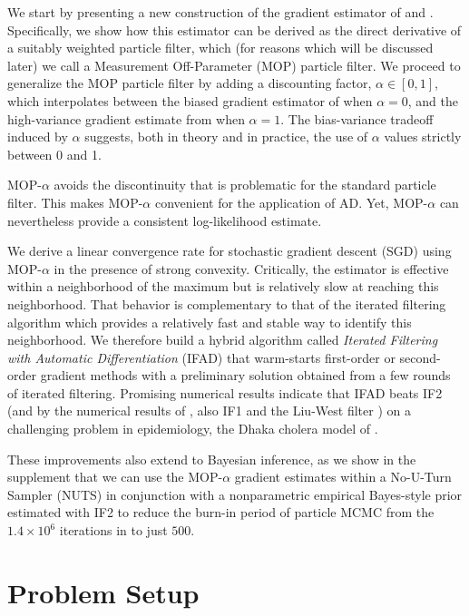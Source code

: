 \documentclass[11pt]{article}
\begin{document}
We start by presenting a new construction of the gradient estimator of \cite{scibior21} and \cite{poyiadjis11}.
Specifically, we show how this estimator can be derived as the direct derivative of a suitably weighted particle filter, which (for reasons which will be discussed later) we call a Measurement Off-Parameter (MOP) particle filter.
We proceed to generalize the MOP particle filter by adding a discounting factor, $\alpha \in [0,1]$, which interpolates between the  biased gradient estimator of \cite{naesseth18} when $\alpha=0$, and the high-variance gradient estimate from \cite{poyiadjis11, scibior21} when $\alpha=1$.
The bias-variance tradeoff induced by $\alpha$ suggests, both in theory and in practice, the use of $\alpha$ values strictly between 0 and 1.

MOP-$\alpha$ avoids the discontinuity that is problematic for the standard particle filter.
This makes MOP-$\alpha$ convenient for the application of AD.
Yet, MOP-$\alpha$  can nevertheless provide a consistent log-likelihood estimate.

We derive a linear convergence rate for stochastic gradient descent (SGD) using MOP-$\alpha$ in the  presence of strong convexity.
Critically, the estimator is effective within a neighborhood of the maximum but is relatively slow at reaching this neighborhood.
That behavior is complementary to that of the iterated filtering algorithm \cite{ionides06-pnas,ionides15} which provides a relatively fast and stable way to identify this neighborhood.
We therefore build a hybrid algorithm called {\it Iterated Filtering with Automatic Differentiation} (IFAD) that warm-starts first-order or second-order gradient methods with a preliminary solution obtained from a few rounds of iterated filtering.
Promising numerical results indicate that IFAD beats IF2 (and by the numerical results of \cite{ionides15}, also IF1 and the Liu-West filter \cite{liuwest01}) on a challenging problem in epidemiology, the Dhaka cholera model of \cite{king08}.

These improvements also extend to Bayesian inference, as we show in the supplement that we can use the MOP-$\alpha$ gradient estimates within a No-U-Turn Sampler (NUTS) \cite{homan14} in conjunction with a nonparametric empirical Bayes-style prior estimated with IF2 to reduce the burn-in period of particle MCMC \cite{andrieu10} from the $1.4 \times 10^6$ iterations in \cite{fasiolo16} to just $500$. 

\section{Problem Setup}
\end{document}
